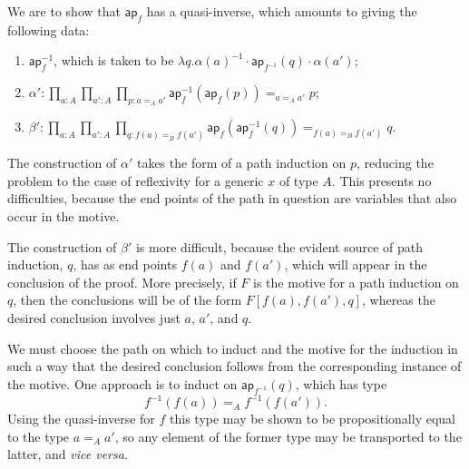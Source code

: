 \documentclass{article}
\newcommand{\idty}[3]{{#2}\mathbin{=_{#1}}{#3}}
\newcommand{\prodty}[3]{\prod_{{#1}{:}{#2}}{#3}}
\newcommand{\lam}[2]{\lambda {#1}{.}{#2}}
\newcommand{\app}[2]{{#1}({#2})}
\newcommand{\pa}[1]{\mathsf{ap}_{#1}}
\newcommand{\iv}[1]{#1^{-1}}
\newcommand{\concat}[2]{{#1}\cdot{#2}}
\begin{document}
We are to show that $\pa{f}$ has a quasi-inverse, which amounts to giving the following data:
\begin{enumerate}
\item $\iv{\pa{f}}$, which is taken to be $\lam{q}{\concat{\concat{\iv{\app{\alpha}{a}}}{\app{\pa{\iv{f}}}{q}}}{\app{\alpha}{a'}}}$;
\item $\alpha':\prodty{a}{A}{\prodty{a'}{A}{\prodty{p}{\idty{A}{a}{a'}}{\idty{\idty{A}{a}{a'}}{\app{\iv{\pa{f}}}{\app{\pa{f}}{p}}}{p}}}}$;
\item $\beta':\prodty{a}{A}{\prodty{a'}{A}{\prodty{q}{\idty{B}{\app{f}{a}}{\app{f}{a'}}}{\idty{\idty{B}{\app{f}{a}}{\app{f}{a'}}}{\app{\pa{f}}{\app{\iv{\pa{f}}}{q}}}{q}}}}$.
\end{enumerate}

The construction of $\alpha'$ takes the form of a path induction on $p$,
reducing the problem to the case of reflexivity for a generic $x$ of type $A$.
This presents no difficulties, because the end points of the path in question
are variables that also occur in the motive.

The construction of $\beta'$ is more difficult, because the evident source of
path induction, $q$, has as end points $\app{f}{a}$ and $\app{f}{a'}$, which
will appear in the conclusion of the proof.  More precisely, if $F$ is the
motive for a path induction on $q$, then the conclusions will be of the form
$F[\app{f}{a},\app{f}{a'},q]$, whereas the desired conclusion involves just $a$,
$a'$, and $q$.

We must choose the path on which to induct and the motive for the induction in
such a way that the desired conclusion follows from the corresponding instance
of the motive.  One approach is to induct on $\app{\pa{\iv{f}}}{q}$, which
has type
$$\idty{A}{\app{\iv{f}}{\app{f}{a}}}{\app{\iv{f}}{\app{f}{a'}}}.$$
Using the quasi-inverse for $f$ this type may be shown to be propositionally
equal to the type $\idty{A}{a}{a'}$, so any element of the former type may be
transported to the latter, and \textit{vice versa}.
\end{document}
